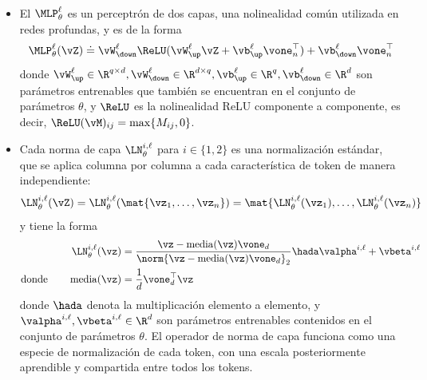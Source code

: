 \documentclass[../../book-main_es.tex]{subfiles}
\begin{document}
\begin{itemize}
\begin{eqnarray}
                [\vU_{\attnkey}^{k, \ell}]^{\top}\vZ, [\vU_{\val}^{k,
            \ell}]^{\top}\vZ)
            \label{eq:attention_map}
        \end{eqnarray}
        también se conocen como el \textit{\(k\)-ésimo mapa de atención} y
        la \textit{\(k\)-ésima salida de la cabeza de atención} en la capa \(\ell\),
        respectivamente. Además, la operación \(\SA(\vQ, \vK,
        \vV)\) se puede calcular de manera extremadamente eficiente utilizando
        software especializado como FlashAttention
        \citep{shah2025flashattention}.
    \item El \(\MLP_{\theta}^{\ell}\) es un perceptrón de dos capas, una
        nolinealidad común utilizada en redes profundas, y es de la forma
        \begin{equation}
            \MLP_{\theta}^{\ell}(\vZ) \doteq
            \vW_{\down}^{\ell}\ReLU(\vW_{\up}^{\ell}\vZ +
            \vb_{\up}^{\ell}\vone_{n}^{\top}) +
            \vb_{\down}^{\ell}\vone_{n}^{\top}
        \end{equation}
        donde \(\vW_{\up}^{\ell} \in \R^{q \times d},
            \vW_{\down}^{\ell} \in \R^{d \times q}, \vb_{\up}^{\ell} \in
        \R^{q}, \vb_{\down}^{\ell} \in \R^{d}\) son parámetros entrenables
        que también se encuentran en el conjunto de parámetros \(\theta\),
        y \(\ReLU\) es la nolinealidad ReLU componente a componente, es decir,
        \(\ReLU(\vM)_{ij} = \max\{M_{ij}, 0\}\).
    \item Cada norma de capa \(\LN_{\theta}^{i, \ell}\) para \(i \in \{1,
        2\}\) es una normalización estándar, que se aplica columna por columna
        a cada característica de token de manera independiente:
        \begin{equation}
            \LN_{\theta}^{i, \ell}(\vZ) = \LN_{\theta}^{i,
            \ell}(\mat{\vz_{1}, \dots, \vz_{n}}) =
            \mat{\LN_{\theta}^{i, \ell}(\vz_{1}), \dots,
            \LN_{\theta}^{i, \ell}(\vz_{n})}
        \end{equation}
        y tiene la forma
        \begin{align}
            \LN_{\theta}^{i, \ell}(\vz)
            &= \frac{\vz
            - \operatorname{media}(\vz)\vone_{d}}{\norm{\vz
            - \operatorname{media}(\vz)\vone_{d}}_{2}} \hada
            \valpha^{i, \ell} + \vbeta^{i, \ell} \\
            \text{donde}
            \qquad \operatorname{media}(\vz) &= \frac{1}{d}\vone_{d}^{\top}\vz
        \end{align}
        donde \(\hada\) denota la multiplicación elemento a elemento, y
        \(\valpha^{i, \ell}, \vbeta^{i, \ell} \in \R^{d}\) son
        parámetros entrenables contenidos en el conjunto de parámetros
        \(\theta\). El operador de norma de capa funciona como una especie de
        normalización de cada token, con una escala posteriormente aprendible y compartida
        entre todos los tokens.
\end{itemize}
\end{document}
